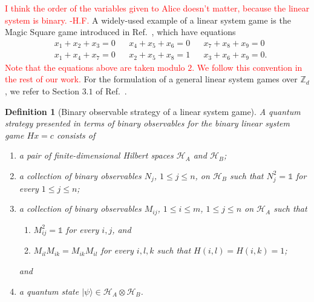 \documentclass[11pt,letterpaper]{article}
\newcommand{\ket}[1]{|#1\rangle}
\newcommand{\x}{\otimes}
\newcommand{\Z}{\mathbb{Z}}
\newcommand{\calH}{\mathcal{H}}
\newcommand{\1}{\mathbb{1}}
\def\carl#1{{\color{blue} #1}}
\newcommand{\hf}[1]{\textcolor{red}{#1}}
\newcommand{\hfc}[1]{\textcolor{red}{#1 -H.F.}}
\newtheorem{definition}[theorem]{Definition}
\theoremstyle{definition}
\begin{document}
\hfc{I think the order of the variables given to Alice doesn't matter, because
the linear system is binary.}
A widely-used example of a linear system game is the Magic Square game introduced in Ref.~\cite{magic_square}, which 
have equations
\begin{align*}
    &x_1 + x_2 + x_3 = 0 && x_4 + x_5 + x_6 = 0 &&
    x_7 + x_8 + x_9 = 0 \\
    &x_1 + x_4 + x_7 = 0 && x_2 + x_5 + x_8 = 1 &&
    x_3 + x_6 + x_9 = 0.
\end{align*}
\hf{Note that the equations above are taken modulo $2$.
We follow this convention in the rest of our work.}
For the formulation of a general linear system games over $\Z_d$, we refer to Section $3.1$ of Ref.~\cite{coladan2017}.

\begin{definition}[Binary observable strategy of a linear system game]
\label{def:q_strat}
A quantum strategy presented in terms of binary observables for the binary linear system game $Hx = c$ consists of 
\begin{enumerate}
	\item a pair of finite-dimensional Hilbert spaces $\calH_A$ and $\calH_B$; 
	\item a collection of binary observables $N_j$, $1 \leq j \leq n$, on $\calH_B$
	such that $N_j^2 = \1$ for every $1 \leq j \leq n$; 
	\item a collection of binary observables $M_{ij}$, $1\leq i \leq m$, $1\leq j\leq n$ 
	on $\calH_A$ such that 
	\begin{enumerate}
		\item $M_{ij}^2 = \1$ for every $i,j$, and
		\item $M_{il}M_{ik} = M_{ik}M_{il}$ for every \carl{$i,l,k$ such that} $H(i,l) = H(i,k) =1$;
	\end{enumerate} 
	and
	\item a quantum state $\ket{\psi} \in \calH_A \x \calH_B$.
\end{enumerate}
\end{definition}
\end{document}

